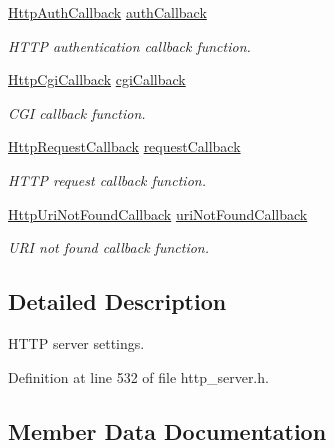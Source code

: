 \begin{DoxyCompactItemize}
\hyperlink{http__server_8h_a8c17db78456f3dac1c2cabf3c0ddacff}{Http\+Auth\+Callback} \hyperlink{structHttpServerSettings_a8604bf4a86848e610a16f8151f97ab88}{auth\+Callback}
\begin{DoxyCompactList}\small\item\em H\+T\+TP authentication callback function. \end{DoxyCompactList}\item 
\hyperlink{http__server_8h_a8c163dde36b62e9d132e1cf5fe4b41ea}{Http\+Cgi\+Callback} \hyperlink{structHttpServerSettings_abee5b324f9d0469ec4011cd02a19db50}{cgi\+Callback}
\begin{DoxyCompactList}\small\item\em C\+GI callback function. \end{DoxyCompactList}\item 
\hyperlink{http__server_8h_ad69441dc912e0643294013910c5a1137}{Http\+Request\+Callback} \hyperlink{structHttpServerSettings_ad4dd665b2139042aef4c86fd2bae0d2a}{request\+Callback}
\begin{DoxyCompactList}\small\item\em H\+T\+TP request callback function. \end{DoxyCompactList}\item 
\hyperlink{http__server_8h_a0ddfa4cd52540a0b533e99372ab06c11}{Http\+Uri\+Not\+Found\+Callback} \hyperlink{structHttpServerSettings_adc5ffb952164a85c426fd76ffb30f2b2}{uri\+Not\+Found\+Callback}
\begin{DoxyCompactList}\small\item\em U\+RI not found callback function. \end{DoxyCompactList}\end{DoxyCompactItemize}


\subsection{Detailed Description}
H\+T\+TP server settings. 

Definition at line 532 of file http\+\_\+server.\+h.



\subsection{Member Data Documentation}
\mbox{\label{structHttpServerSettings_a8604bf4a86848e610a16f8151f97ab88}} 
